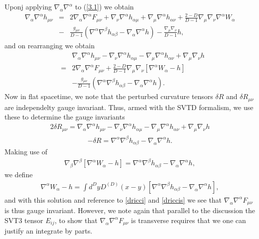 Uponj applying $\nabla_{\alpha}\nabla^{\alpha}$ to (\ref{3.1}) we obtain
%
\begin{eqnarray}
\nabla_{\alpha}\nabla^{\alpha}h_{\mu\nu}&=&2\nabla_{\alpha}\nabla^{\alpha}F_{\mu\nu}+\nabla_{\nu}\nabla^{\alpha}h_{\alpha\mu}+\nabla_{\mu}\nabla^{\alpha}h_{\alpha\nu}+\frac{2-D}{D-1}\nabla_{\mu}\nabla_{\nu}\nabla^{\alpha}W_{\alpha}
\nonumber\\
&-&\frac{g_{\mu\nu}}{D-1}(\nabla^{\alpha}\nabla^{\beta}h_{\alpha\beta}-\nabla_{\alpha}\nabla^{\alpha}h)-\frac{\nabla_{\mu}\nabla_{\nu}}{D-1}h,
\label{3.4}
\end{eqnarray}
%
and on rearranging we obtain
%
\begin{eqnarray}
&&\nabla_{\alpha}\nabla^{\alpha}h_{\mu\nu}-\nabla_{\nu}\nabla^{\alpha}h_{\alpha\mu}-\nabla_{\mu}\nabla^{\alpha}h_{\alpha\nu}+\nabla_{\mu}\nabla_{\nu}h
\nonumber\\
&=&2\nabla_{\alpha}\nabla^{\alpha}F_{\mu\nu}+\frac{2-D}{D-1}\nabla_{\mu}\nabla_{\nu}[\nabla^{\alpha}W_{\alpha}-h]
\nonumber\\
&&-\frac{g_{\mu\nu}}{D-1}(\nabla^{\alpha}\nabla^{\beta}h_{\alpha\beta}-\nabla_{\alpha}\nabla^{\alpha}h).
\label{3.5}
\end{eqnarray}
%
Now in flat spacetime, we note that the perturbed curvature tensors $\delta R$ and $\delta R_{\mu\nu}$ are independelty gauge invariant. Thus, armed with the SVTD formalism, we use these to determine the gauge invariants
%
\begin{eqnarray}
2\delta R_{\mu\nu} = \nabla_{\alpha}\nabla^{\alpha}h_{\mu\nu}-\nabla_{\nu}\nabla^{\alpha}h_{\alpha\mu}-\nabla_{\mu}\nabla^{\alpha}h_{\alpha\nu}+\nabla_{\mu}\nabla_{\nu}h
\label{dricci}
\end{eqnarray}
%
%
\begin{eqnarray}
-\delta R = \nabla^{\alpha}\nabla^{\beta}h_{\alpha\beta}-\nabla_{\alpha}\nabla^{\alpha}h.
\label{driccis}
\end{eqnarray}
Making use of
%
\begin{eqnarray}
\nabla_{\beta}\nabla^{\beta}[\nabla^{\alpha}W_{\alpha}-h]=\nabla^{\alpha}\nabla^{\beta}h_{\alpha\beta}-\nabla_{\alpha}\nabla^{\alpha}h,
\label{3.6}
\end{eqnarray}
%
we define
%
\begin{eqnarray}
\nabla^{\alpha}W_{\alpha}-h=\int d^DyD^{(D)}(x-y)[\nabla^{\alpha}\nabla^{\beta}h_{\alpha\beta}-\nabla_{\alpha}\nabla^{\alpha}h],
\label{3.7}
\end{eqnarray}
%
and with this solution and reference to \eqref{dricci} and \eqref{driccis} we see that  $\nabla_{\alpha}\nabla^{\alpha}F_{\mu\nu}$ is thus gauge invariant. However, we note again that parallel to the discussion the SVT3 tensor $E_{ij}$, to show that $\nabla_{\alpha}\nabla^{\alpha}F_{\mu\nu}$ is transverse requires that we one can justify an integrate by parts.

